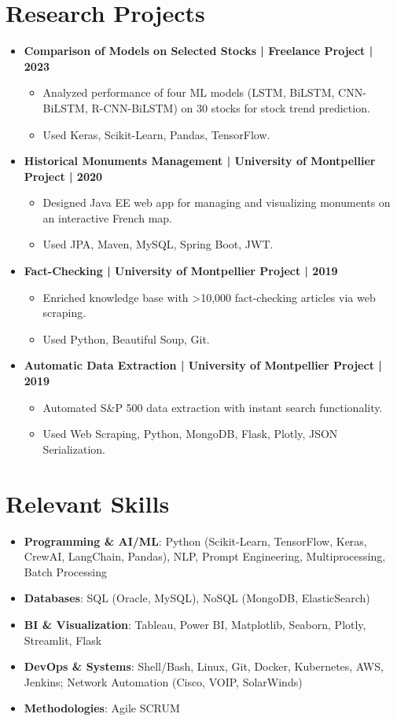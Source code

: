 \documentclass[11pt,a4paper]{article}
\begin{document}
\section*{Research Projects}
\begin{itemize}
  \item \textbf{Comparison of Models on Selected Stocks | Freelance Project | 2023}
    \begin{itemize}
    \item Analyzed performance of four ML models (LSTM, BiLSTM, CNN-BiLSTM, R-CNN-BiLSTM) on 30 stocks for stock trend prediction.
    \item Used Keras, Scikit-Learn, Pandas, TensorFlow.
\end{itemize}
\item \textbf{Historical Monuments Management | University of Montpellier Project | 2020}
  \begin{itemize}
  \item Designed Java EE web app for managing and visualizing monuments on an interactive French map.
  \item Used JPA, Maven, MySQL, Spring Boot, JWT.
  \end{itemize}
  \item \textbf{Fact-Checking | University of Montpellier Project | 2019}
    \begin{itemize}
    \item Enriched knowledge base with >10,000 fact-checking articles via web scraping.
    \item Used Python, Beautiful Soup, Git.
    \end{itemize}
  \item \textbf{Automatic Data Extraction | University of Montpellier Project | 2019}
    \begin{itemize}
    \item Automated S\&P 500 data extraction with instant search functionality.
    \item Used Web Scraping, Python, MongoDB, Flask, Plotly, JSON Serialization.
    \end{itemize}
\end{itemize}

\section*{Relevant Skills}
\begin{itemize}
  \item \textbf{Programming \& AI/ML}: Python (Scikit-Learn, TensorFlow, Keras, CrewAI, LangChain, Pandas), NLP, Prompt Engineering, Multiprocessing, Batch Processing
  \item \textbf{Databases}: SQL (Oracle, MySQL), NoSQL (MongoDB, ElasticSearch)
  \item \textbf{BI \& Visualization}: Tableau, Power BI, Matplotlib, Seaborn, Plotly, Streamlit, Flask
  \item \textbf{DevOps \& Systems}: Shell/Bash, Linux, Git, Docker, Kubernetes, AWS, Jenkins; Network Automation (Cisco, VOIP, SolarWinds)
  \item \textbf{Methodologies}: Agile SCRUM
\end{itemize}
\end{document}
